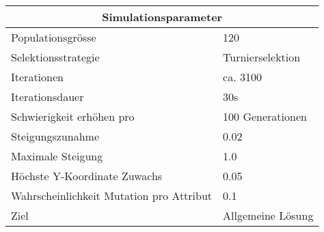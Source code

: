 
\begin{tabular}{ | l | l | }

  \hline
  \multicolumn{2}{|c|}{Simulationsparameter} \\
  \hline
  Populationsgrösse & 120 \\ \hline
  Selektionsstrategie & Turnierselektion \\ \hline
  Iterationen & ca. 3100 \\ \hline
  Iterationsdauer & 30s \\ \hline
  Schwierigkeit erhöhen pro & 100 Generationen \\ \hline
  Steigungszunahme & 0.02 \\ \hline
  Maximale Steigung & 1.0 \\ \hline
  Höchste Y-Koordinate Zuwachs & 0.05 \\ \hline
  Wahrscheinlichkeit Mutation pro Attribut & 0.1 \\ \hline
  Ziel & Allgemeine Lösung \\ \hline

\end{tabular}
